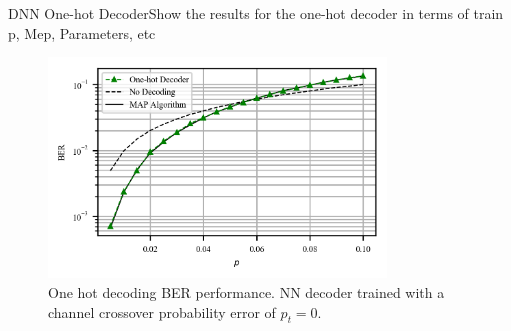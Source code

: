 \documentclass{beamer}
\begin{document}
\begin{frame}{DNN One-hot Decoder}{Show the results for the one-hot decoder in terms of train p, Mep, Parameters, etc}
    
   \begin{figure}[!ht]
  \centering
    \includegraphics[width=0.8\textwidth]{images/MLNN1H_Mep_16384_ptrain_0}
    \caption{One hot decoding BER performance. NN decoder trained with a channel crossover probability error of $p_t=0$.}\label{fig:1HD}
\end{figure}

\end{frame}
\end{document}
